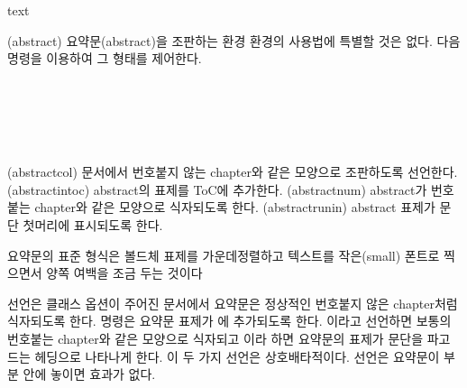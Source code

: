 %
\begin{syntax}
 text  \\
\end{syntax}
\glossary(abstract)%
  {}%
  {요약문(abstract)을 조판하는 환경}
 환경의 사용법에 특별할 것은 없다. 다음 명령을 이용하여
그 형태를 제어한다.

\begin{syntax}
\cmd{\abstractcol} \\
\cmd{\abstractintoc} \\
\cmd{\abstractnum} \\
\cmd{\abstractrunin} \\
\end{syntax}
\glossary(abstractcol)%
  {}%
  { 문서에서 번호붙지 않는 chapter와 같은 모양으로 조판하도록
  선언한다.}
\glossary(abstractintoc)%
  {}%
  {abstract의 표제를 ToC에 추가한다.}
\glossary(abstractnum)%
  {}%
  {abstract가 번호붙는 chapter와 같은 모양으로 식자되도록 한다.}
\glossary(abstractrunin)%
  {}%
  {abstract 표제가 문단 첫머리에 표시되도록 한다.}

요약문의 표준 형식은 볼드체 표제를 가운데정렬하고 텍스트를 작은(small) 폰트로
찍으면서 양쪽 여백을 조금 두는 것이다

%
\cmd{\abstractcol} 선언은  클래스 옵션이 주어진 문서에서 
요약문은 정상적인 번호붙지 않은 chapter처럼 식자되도록 한다.
\cmd{\abstractintoc} 명령은 요약문 표제가 \toc 에 추가되도록 한다. \cmd{\abstractnum}이라고 선언하면 보통의 번호붙는 chapter와 같은 모양으로 식자되고
\cmd{\abstractrunin}이라 하면 요약문의 표제가 문단을 파고드는 헤딩으로 나타나게 한다.
이 두 가지 선언은 상호배타적이다. \cmd{\abstractnum} 선언은 요약문이 \cmd{\frontmatter} 부분 안에 놓이면 효과가 없다.


